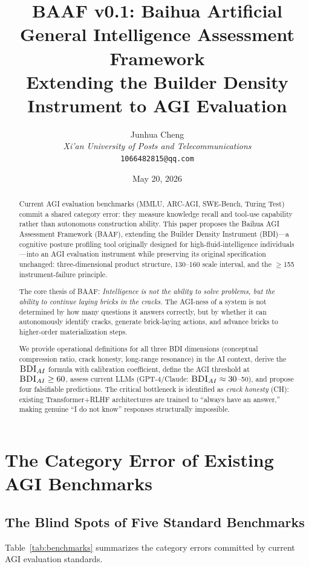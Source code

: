 \documentclass[11pt,a4paper]{article}
\title{\textbf{BAAF v0.1: Baihua Artificial General Intelligence Assessment Framework}\\\vspace{0.3em}\large Extending the Builder Density Instrument to AGI Evaluation}
\author{Junhua Cheng\\\textit{Xi'an University of Posts and Telecommunications}\\\texttt{1066482815@qq.com}}
\date{May 20, 2026}
\theoremstyle{definition}
\theoremstyle{plain}
\newcommand{\BDI}{\textsc{BDI}}
\newcommand{\BAAF}{\textsc{BAAF}}
\newcommand{\CH}{\textsc{CH}}
\begin{document}
\maketitle

\begin{abstract}
Current AGI evaluation benchmarks (MMLU, ARC-AGI, SWE-Bench, Turing Test) commit a shared category error: they measure knowledge recall and tool-use capability rather than autonomous construction ability. This paper proposes the Baihua AGI Assessment Framework (\BAAF{}), extending the Builder Density Instrument (\BDI{})---a cognitive posture profiling tool originally designed for high-fluid-intelligence individuals---into an AGI evaluation instrument while preserving its original specification unchanged: three-dimensional product structure, 130--160 scale interval, and the $\geq$155 instrument-failure principle.

The core thesis of \BAAF{}: \textit{Intelligence is not the ability to solve problems, but the ability to continue laying bricks in the cracks.} The AGI-ness of a system is not determined by how many questions it answers correctly, but by whether it can autonomously identify cracks, generate brick-laying actions, and advance bricks to higher-order materialization steps.

We provide operational definitions for all three \BDI{} dimensions (conceptual compression ratio, crack honesty, long-range resonance) in the AI context, derive the $\BDI_{AI}$ formula with calibration coefficient, define the AGI threshold at $\BDI_{AI} \geq 60$, assess current LLMs (GPT-4/Claude: $\BDI_{AI} \approx 30$--50), and propose four falsifiable predictions. The critical bottleneck is identified as \textit{crack honesty} (\CH{}): existing Transformer+RLHF architectures are trained to ``always have an answer,'' making genuine ``I do not know'' responses structurally impossible.
\end{abstract}

\section{The Category Error of Existing AGI Benchmarks}
\label{sec:category-error}

\subsection{The Blind Spots of Five Standard Benchmarks}

Table~\ref{tab:benchmarks} summarizes the category errors committed by current AGI evaluation standards.
\end{document}
